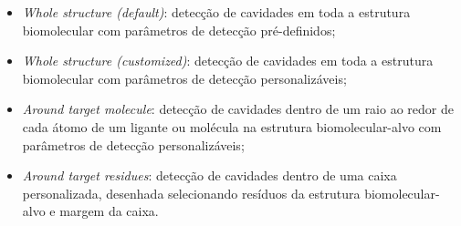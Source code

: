 \documentclass[Portugues]{phdquali}
\begin{document}
\begin{itemize}
  \item \textit{Whole structure (default)}: detecção de cavidades em toda a estrutura biomolecular com parâmetros de detecção pré-definidos;
  \item \textit{Whole structure (customized)}: detecção de cavidades em toda a estrutura biomolecular com parâmetros de detecção personalizáveis;
  \item \textit{Around target molecule}: detecção de cavidades dentro de um raio ao redor de cada átomo de um ligante ou molécula na estrutura biomolecular-alvo com parâmetros de detecção personalizáveis;
  \item \textit{Around target residues}: detecção de cavidades dentro de uma caixa personalizada, desenhada selecionando resíduos da estrutura biomolecular-alvo e margem da caixa.
\end{itemize}
\end{document}
